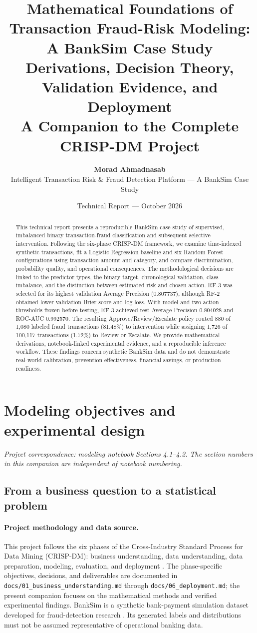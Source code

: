 \documentclass[11pt,a4paper]{article}
\title{\textbf{Mathematical Foundations of Transaction Fraud-Risk Modeling: A BankSim Case Study}\\[5pt]\large Derivations, Decision Theory, Validation Evidence, and Deployment\\ A Companion to the Complete CRISP-DM Project}
\author{\textbf{Morad Ahmadnasab}\\[5pt]Intelligent Transaction Risk \& Fraud Detection Platform --- A BankSim Case Study}
\date{Technical Report --- October 2026}
\begin{document}
\maketitle
\begin{abstract}
This technical report presents a reproducible BankSim case study of supervised,
imbalanced binary transaction-fraud classification and subsequent selective
intervention. Following the six-phase CRISP-DM framework, we examine
time-indexed synthetic transactions, fit a Logistic Regression baseline and
six Random Forest configurations using transaction amount and category, and
compare discrimination, probability quality, and operational consequences.
The methodological decisions are linked to the predictor types, the binary
target, chronological validation, class imbalance, and the distinction
between estimated risk and chosen action. RF-3 was selected for its highest
validation Average Precision (0.807737), although RF-2 obtained lower
validation Brier score and log loss. With model and two action thresholds
frozen before testing, RF-3 achieved test Average Precision 0.804028 and
ROC-AUC 0.992570. The resulting Approve/Review/Escalate policy routed
880 of 1,080 labeled fraud transactions (81.48\%) to intervention while
assigning 1,726 of 100,117 transactions (1.72\%) to Review or Escalate.
We provide mathematical derivations, notebook-linked experimental evidence,
and a reproducible inference workflow. These findings concern synthetic
BankSim data and do not demonstrate real-world calibration, prevention
effectiveness, financial savings, or production readiness.
\end{abstract}
\tableofcontents\newpage
\section{Modeling objectives and experimental design}
\noindent\textit{Project correspondence: modeling notebook Sections 4.1--4.2. The section numbers in this companion are independent of notebook numbering.}

\subsection{From a business question to a statistical problem}
\paragraph{Project methodology and data source.}
This project follows the six phases of the Cross-Industry Standard Process for Data Mining
(CRISP-DM): business understanding, data understanding, data preparation, modeling,
evaluation, and deployment \cite{chapman2000}. The phase-specific objectives, decisions,
and deliverables are documented in \texttt{docs/01\_business\_understanding.md}
through \texttt{docs/06\_deployment.md}; the present companion focuses on the
mathematical methods and verified experimental findings. BankSim is a synthetic
bank-payment simulation dataset developed for fraud-detection research
\cite{lopezrojas2014}. Its generated labels and distributions must not be assumed
representative of operational banking data.
\end{document}
